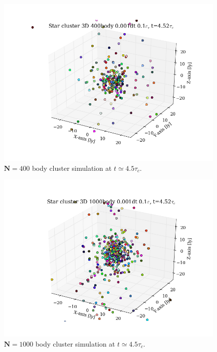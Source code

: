 \documentclass[11pt,a4paper,notitlepage,twocolumn]{article}
\begin{document}
\begin{figure}
[H]\center
\includegraphics[scale=0.35]{../moviefigs/eps10/ClusterPos_400body_dt1_eps10_dur16.png}
\caption{$\mathbf{N} = 400$ body cluster simulation at $t \simeq 4.5\tau_c$.}\label{fig:N400eps10eq}
\end{figure}
\begin{figure}
[H]\center
\includegraphics[scale=0.35]{../moviefigs/eps10/ClusterPos_1000body_dt1_eps10_dur16.png}
\caption{$\mathbf{N} = 1000$ body cluster simulation at $t \simeq 4.5\tau_c$.}\label{fig:N1000eps10eq}
\end{figure}
\end{document}
